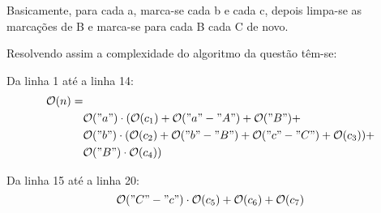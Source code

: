 \documentclass{article}
\begin{document}
Basicamente, para cada a, marca-se cada b e cada c, depois limpa-se as
marcações de B e marca-se para cada B cada C de novo.

Resolvendo assim a complexidade do algoritmo da questão têm-se:

Da linha 1 até a linha 14:
\begin{align}
  \begin{split}
    \mathcal{O}(n) = &{}\\
                     &\mathcal{O}("a") \cdot (\mathcal{O}(c_1) + \mathcal{O}("a"-"A") + \mathcal{O}("B") + \\
                     &\mathcal{O}("b") \cdot (\mathcal{O}(c_2) + \mathcal{O}("b"-"B") + \mathcal{O}("c"-"C") + \mathcal{O}(c_3)) + \\
                     &\mathcal{O}("B") \cdot \mathcal{O}(c_4)) \\
\end{split}
\end{align}

Da linha 15 até a linha 20:
$$\mathcal{O}("C"-"c") \cdot \mathcal{O}(c_5) + \mathcal{O}(c_6) + \mathcal{O}(c_7)$$
\end{document}
